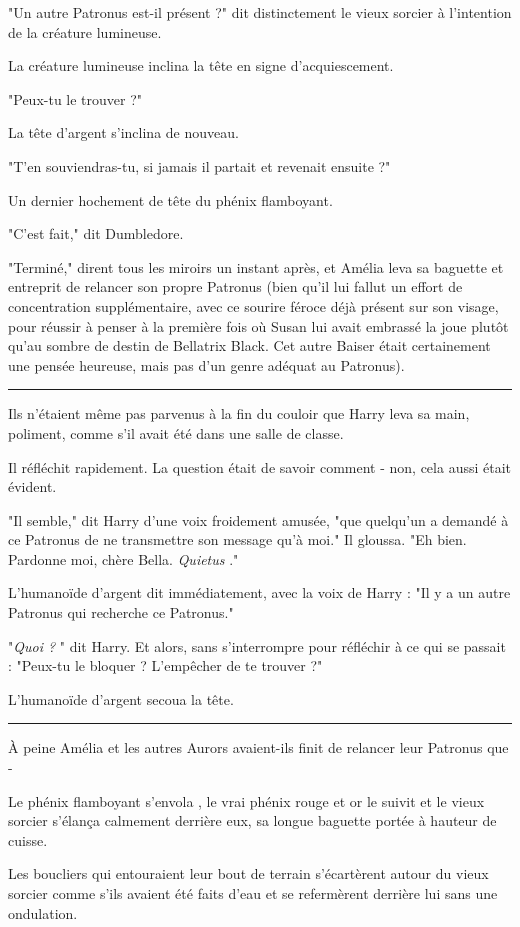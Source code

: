 "Un autre Patronus est-il présent ?" dit distinctement le vieux sorcier à l'intention de la créature lumineuse.

La créature lumineuse inclina la tête en signe d'acquiescement.

"Peux-tu le trouver ?"

La tête d'argent s'inclina de nouveau.

"T'en souviendras-tu, si jamais il partait et revenait ensuite ?"

Un dernier hochement de tête du phénix flamboyant.

"C'est fait," dit Dumbledore.

"Terminé," dirent tous les miroirs un instant après, et Amélia leva sa baguette et entreprit de relancer son propre Patronus (bien qu'il lui fallut un effort de concentration supplémentaire, avec ce sourire féroce déjà présent sur son visage, pour réussir à penser à la première fois où Susan lui avait embrassé la joue plutôt qu'au sombre de destin de Bellatrix Black. Cet autre Baiser était certainement une pensée heureuse, mais pas d'un genre adéquat au Patronus).
\par\noindent\rule{\textwidth}{0.4pt}
Ils n'étaient même pas parvenus à la fin du couloir que Harry leva sa main, poliment, comme s'il avait été dans une salle de classe.

Il réfléchit rapidement. La question était de savoir comment - non, cela aussi était évident.

"Il semble," dit Harry d'une voix froidement amusée, "que quelqu'un a demandé à ce Patronus de ne transmettre son message qu'à moi." Il gloussa. "Eh bien. Pardonne moi, chère Bella. \emph{Quietus} ."

L'humanoïde d'argent dit immédiatement, avec la voix de Harry : "Il y a un autre Patronus qui recherche ce Patronus."

"\emph{Quoi ?} " dit Harry. Et alors, sans s'interrompre pour réfléchir à ce qui se passait : "Peux-tu le bloquer ? L'empêcher de te trouver ?"

L'humanoïde d'argent secoua la tête.
\par\noindent\rule{\textwidth}{0.4pt}
À peine Amélia et les autres Aurors avaient-ils finit de relancer leur Patronus que -

Le phénix flamboyant s'envola , le vrai phénix rouge et or le suivit et le vieux sorcier s'élança calmement derrière eux, sa longue baguette portée à hauteur de cuisse.

Les boucliers qui entouraient leur bout de terrain s'écartèrent autour du vieux sorcier comme s'ils avaient été faits d'eau et se refermèrent derrière lui sans une ondulation.

